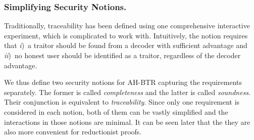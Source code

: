 \subsubsection{Simplifying Security Notions.}
Traditionally, traceability has been defined using one comprehensive interactive experiment, which is complicated to work with.
Intuitively, the notion requires that
\emph{i})~a traitor should be found from a decoder with sufficient advantage and
\emph{ii})~no honest user should be identified as a traitor, regardless of the decoder advantage.

We thus define two security notions for AH-BTR capturing the requirements separately.
The former is called \emph{completeness} and the latter is called \emph{soundness}.
Their conjunction is equivalent to \emph{traceability}.
Since only one requirement is considered in each notion,
both of them can be vastly simplified and the interactions in those notions are minimal.
It can be seen later that the they are also more convenient for reductionist proofs.
